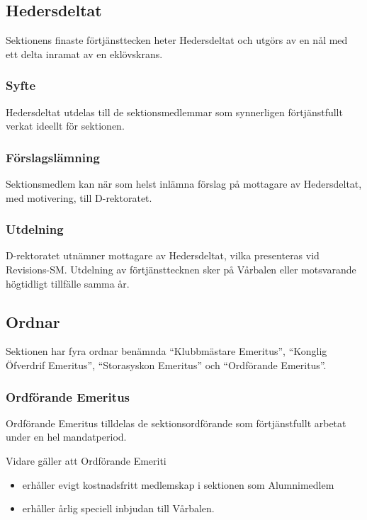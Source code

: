 \documentclass{dgovdoc}
\begin{document}
\subsection{Hedersdeltat}

Sektionens finaste förtjänsttecken heter Hedersdeltat och utgörs av en nål med
ett delta inramat av en eklövskrans.

\subsubsection{Syfte}

Hedersdeltat utdelas till de sektionsmedlemmar som synnerligen förtjänstfullt
verkat ideellt för sektionen.

\subsubsection{Förslagslämning}

Sektionsmedlem kan när som helst inlämna förslag på mottagare av Hedersdeltat,
med motivering, till D-rektoratet.

\subsubsection{Utdelning}

D-rektoratet utnämner mottagare av Hedersdeltat, vilka presenteras vid
Revisions-SM. Utdelning av förtjänsttecknen sker på Vårbalen eller motsvarande
högtidligt tillfälle samma år.

\subsection{Ordnar}

Sektionen har fyra ordnar benämnda ``Klubbmästare Emeritus'', ``Konglig
Öfverdrif Emeritus'', ``Storasyskon Emeritus'' och ``Ordförande Emeritus''.

\subsubsection{Ordförande Emeritus}

Ordförande Emeritus tilldelas de sektionsordförande som förtjänstfullt arbetat
under en hel mandatperiod.

Vidare gäller att Ordförande Emeriti

\begin{itemize}
  \item erhåller evigt kostnadsfritt medlemskap i sektionen som Alumnimedlem
  \item erhåller årlig speciell inbjudan till Vårbalen.
\end{itemize}
\end{document}
